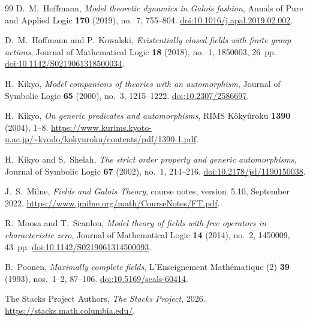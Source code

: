 \documentclass[11pt,a4paper]{amsart}
\theoremstyle{definition}
\begin{document}
\begin{thebibliography}{99}
D.~M.~Hoffmann,
\emph{Model theoretic dynamics in Galois fashion},
Annals of Pure and Applied Logic
\textbf{170} (2019), no.~7, 755--804.
\href{https://doi.org/10.1016/j.apal.2019.02.002}
{doi:10.1016/j.apal.2019.02.002}.

D.~M.~Hoffmann and P.~Kowalski,
\emph{Existentially closed fields with finite group actions},
Journal of Mathematical Logic
\textbf{18} (2018), no.~1, 1850003, 26~pp.
\href{https://doi.org/10.1142/S0219061318500034}
{doi:10.1142/S0219061318500034}.

H.~Kikyo,
\emph{Model companions of theories with an automorphism},
Journal of Symbolic Logic
\textbf{65} (2000), no.~3, 1215--1222.
\href{https://doi.org/10.2307/2586697}
{doi:10.2307/2586697}.

H.~Kikyo,
\emph{On generic predicates and automorphisms},
RIMS K\^oky\^uroku \textbf{1390} (2004), 1--8.
\url{https://www.kurims.kyoto-u.ac.jp/~kyodo/kokyuroku/contents/pdf/1390-1.pdf}.

H.~Kikyo and S.~Shelah,
\emph{The strict order property and generic automorphisms},
Journal of Symbolic Logic
\textbf{67} (2002), no.~1, 214--216.
\href{https://doi.org/10.2178/jsl/1190150038}
{doi:10.2178/jsl/1190150038}.

J.~S.~Milne,
\emph{Fields and Galois Theory},
course notes, version~5.10, September 2022.
\url{https://www.jmilne.org/math/CourseNotes/FT.pdf}.

R.~Moosa and T.~Scanlon,
\emph{Model theory of fields with free operators in characteristic zero},
Journal of Mathematical Logic
\textbf{14} (2014), no.~2, 1450009, 43~pp.
\href{https://doi.org/10.1142/S0219061314500093}
{doi:10.1142/S0219061314500093}.

B.~Poonen,
\emph{Maximally complete fields},
L'Enseignement Math\'ematique (2)
\textbf{39} (1993), nos.~1--2, 87--106.
\href{https://doi.org/10.5169/seals-60414}
{doi:10.5169/seals-60414}.

The Stacks Project Authors,
\emph{The Stacks Project}, 2026.
\url{https://stacks.math.columbia.edu/}.

\end{thebibliography}
\end{document}
